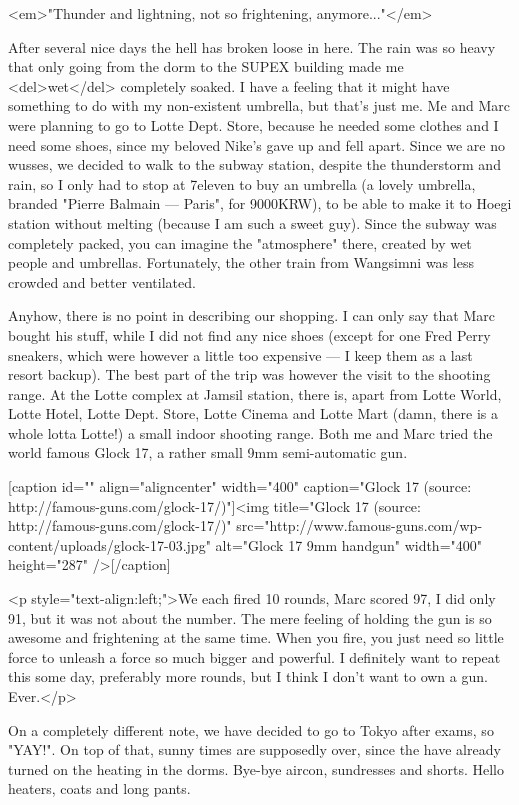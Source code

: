 \begin{post}
	\begin{content}
<em>"Thunder and lightning, not so frightening, anymore..."</em>



After several nice days the hell has broken loose in here. The rain was so heavy that only going from the dorm to the SUPEX building made me <del>wet</del> completely soaked. I have a feeling that it might have something to do with my non-existent umbrella, but that's just me. Me and Marc were planning to go to Lotte Dept. Store, because he needed some clothes and I need some shoes, since my beloved Nike's gave up and fell apart. Since we are no wusses, we decided to walk to the subway station, despite the thunderstorm and rain, so I only had to stop at 7eleven to buy an umbrella (a lovely umbrella, branded "Pierre Balmain — Paris", for 9000KRW), to be able to make it to Hoegi station without melting (because I am such a sweet guy). Since the subway was completely packed, you can imagine the "atmosphere" there, created by wet people and umbrellas. Fortunately, the other train from Wangsimni was less crowded and better ventilated.



Anyhow, there is no point in describing our shopping. I can only say that Marc bought his stuff, while I did not find any nice shoes (except for one Fred Perry sneakers, which were however a little too expensive — I keep them as a last resort backup). The best part of the trip was however the visit to the shooting range. At the Lotte complex at Jamsil station, there is, apart from Lotte World, Lotte Hotel, Lotte Dept. Store, Lotte Cinema and Lotte Mart (damn, there is a whole lotta Lotte!) a small indoor shooting range. Both me and Marc tried the world famous Glock 17, a rather small 9mm semi-automatic gun.



[caption id="" align="aligncenter" width="400" caption="Glock 17 (source: http://famous-guns.com/glock-17/)"]<img title="Glock 17 (source: http://famous-guns.com/glock-17/)" src="http://www.famous-guns.com/wp-content/uploads/glock-17-03.jpg" alt="Glock 17 9mm handgun" width="400" height="287" />[/caption]

<p style="text-align:left;">We each fired 10 rounds, Marc scored 97, I did only 91, but it was not about the number. The mere feeling of holding the gun is so awesome and frightening at the same time. When you fire, you just need so little force to unleash a force so much bigger and powerful. I definitely want to repeat this some day, preferably more rounds, but I think I don't want to own a gun. Ever.</p>

On a completely different note, we have decided to go to Tokyo after exams, so "YAY!". On top of that, sunny times are supposedly over, since the have already turned on the heating in the dorms. Bye-bye aircon, sundresses and shorts. Hello heaters, coats and long pants.
	\end{content}
\end{post}
